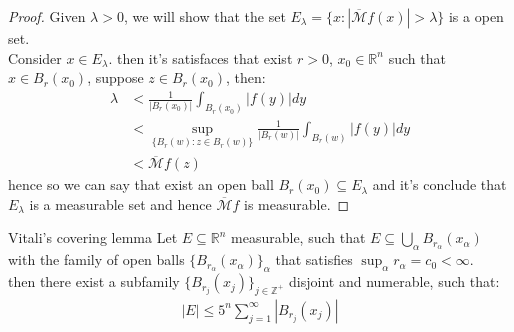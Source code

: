 \begin{proof} 
  Given $\lambda>0$, we will show that the set $E_{\lambda}=\{x:|\overline{\mathcal{M}}f(x)|>\lambda\}$ is a open set.\\
  Consider $x\in E_{\lambda}$. then it's satisfaces that exist $r>0$, $x_0\in \mathbb{R}^{n}$ such that $x\in B_{r}(x_0)$, suppose $z\in B_{r}(x_0)$, then:
  \begin{align*}
    \lambda &<  \frac{1}{|B_{r}(x_0)|}\int_{B_{r}(x_0)}|f(y)|dy\\
    &< \sup_{\{B_{r}(w):z\in B_{r}(w)\}}\frac{1}{|B_{r}(w)|}\int_{B_{r}(w)}|f(y)|dy\\
    &< \overline{\mathcal{M}}f(z) 
  \end{align*}
  hence so we can say that exist an open ball $B_{r}(x_0)\subseteq E_{\lambda}$ and it's conclude that $E_\lambda$ is a measurable set and hence $\overline{\mathcal{M}}f$ is measurable. 
\end{proof}

\begin{lemma}{Vitali's covering lemma}\label{lemma:vitalis_covering}
  Let $E\subseteq \mathbb{R}^{n}$ measurable, such that $E\subseteq \bigcup_{\alpha}B_{r_{\alpha}}(x_\alpha)$ with the family of open balls  $\{B_{r_{\alpha}}(x_{\alpha})\}_{\alpha}$ that satisfies $\sup_{\alpha}r_{\alpha}=c_0<\infty$.\\
  then there exist a subfamily $\{B_{r_j}(x_j)\}_{j\in\mathbb{Z}^{+}}$ disjoint and numerable, such that:
  \begin{align*}
    |E|\leq 5^{n}\sum_{j=1}^{\infty}|B_{r_j}(x_j)|
  \end{align*}
\end{lemma}

